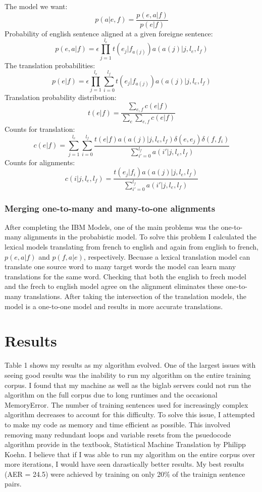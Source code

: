 \documentclass{article}
\begin{document}
The model we want:
$$ p(a|e,f) = \frac{p(e,a|f)}{p(e|f)} $$ 
Probability of english sentence aligned at a given foreigne sentence:
$$p(e,a|f) = \epsilon\prod_{j=1}^{l_e}{t(e_j|f_{a(j)})a(a(j)|j,l_e,l_f)} $$
The translation probabilities:
$$p(e|f) = \epsilon\prod_{j=1}^{l_e}{\sum_{i=0}^{l_f}{t(e_j|f_{a(j)})a(a(j)|j,l_e,l_f)}} $$
Translation probability distribution:
$$ t(e|f) = \frac{\sum_{e,f}{c(e|f)}}{\sum_{e}\sum_{e,f}{c(e|f)}} $$ 
Counts for translation:
$$c(e|f) = \sum_{j=1}^{l_e}{\sum_{i=0}^{l_f}{\frac{t(e|f)a(a(j)|j,l_e,l_f)\delta(e,e_j)\delta(f,f_i)}{\sum_{i'=0}^{l_f}{a(i'|j,l_e,l_f)}}}} $$
Counts for alignments:
$$ c(i|j,l_e,l_f) = \frac{t(e_j|f_i)a(a(j)|j,l_e,l_f)}{\sum_{i'=0}^{l_f}{a(i'|j,l_e,l_f)}} $$



\subsubsection{Merging one-to-many and many-to-one alignments}
\par
After completing the IBM Models, one of the main problems was the one-to-many alignments in the probabistic model. To solve this problem I calculated the lexical models translating from french to english and again from english to french, $p(e,a|f)$ and $p(f,a|e)$, respectively. Becuase a lexical translation model can translate one source word to many target words the model can learn many translations for the same word. Checking that both the english to frech model and the frech to english model agree on the alignment eliminates these one-to-many translations. After taking the intersection of the translation models, the model is a one-to-one model and results in more accurate translations.


\section{Results}
Table 1 shows my results as my algorithm evolved. One of the largest issues with seeing good results was the inability to run my algorithm on the entire training corpus. I found that my machine as well as the biglab servers could not run the algorithm on the full corpus due to long runtimes and the occasional MemoryError. The number of training sentences used for increasingly complex algorithm decreases to account for this difficulty. To solve this issue, I attempted to make my code as memory and time efficient as possible. This involved removing many redundant loops and variable resets from the psuedocode algorithm provide in the textbook, Statistical Machine Translation by Philipp  Koehn. I believe that if I was able to run my algorithm on the entire corpus over more iterations, I would have seen darastically better results. My best results (AER = 24.5) were achieved by training on only 20\% of the trainign sentence pairs. 
\end{document}
